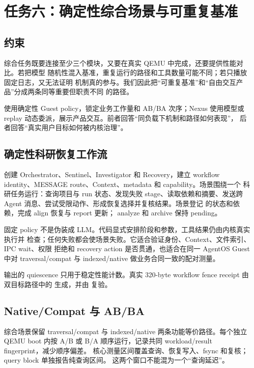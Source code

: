 \chapter{任务六：确定性综合场景与可重复基准}
\label{chap:task6}

\section{约束}

综合任务既要连接至少三个模块，又要在真实 QEMU 中完成，还要提供性能对比。若把模型
随机性混入基准，重复运行的路径和工具数量可能不同；若只播放固定日志，又无法证明
机制真的参与。我们因此把“可重复基准”和“自由交互产品”分成两条同等重要但职责不同
的路径。

 使用确定性 Guest policy，锁定业务工作量和 AB/BA 次序；Nexus
使用模型或 replay 动态委派，展示产品交互。前者回答“同负载下机制和路径如何表现”，
后者回答“真实用户目标如何被内核治理”。

\section{确定性科研恢复工作流}

 创建 Orchestrator、Sentinel、Investigator 和 Recovery，建立
workflow identity、MESSAGE route、Context、metadata 和 capability。场景围绕一个
科研任务运行：查询项目与 run 状态、发现失败 stage、读取依赖和摘要、发送跨 Agent
消息、尝试受限动作、形成恢复选择并复核结果。场景登记
 的状态和依赖，完成 align 恢复与 report 更新；
analyze 和 archive 保持 pending。

固定 policy 不是伪装成 LLM。代码显式安排阶段和参数，工具结果仍由内核真实执行并
检查；任何失败都会使场景失败。它适合验证身份、Context、文件索引、IPC wait、权限
拒绝和 recovery action 是否贯通，也适合在同一 AgentOS Guest 中对 traversal/compat 与
indexed/native 做业务合同一致的配对测量。

 输出的  quiescence 只用于稳定性能计数。真实
320-byte workflow fence receipt 由双目标路径中的  生成，并由
 复验。

\section{Native/Compat 与 AB/BA}

综合场景保留 traversal/compat 与 indexed/native 两条功能等价路径。每个独立 QEMU boot
内按 A/B 或 B/A 顺序运行，记录共同 workload/result fingerprint，减少顺序偏差。
核心测量区间覆盖查询、恢复写入、fsync 和复核；query block 单独报告纯查询区间。
这两个窗口不能混为一个“查询延迟”。

